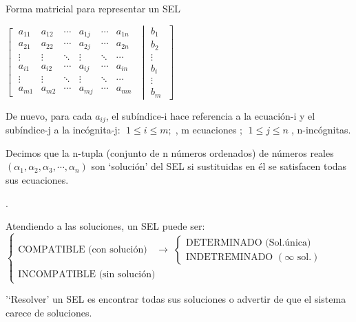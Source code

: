 \begin{myblock}{Forma matricial para representar un SEL}
\centerline{
$\left[ \begin{matrix}
\; a_{11} & a_{12} & \cdots & a_{1j} & \cdots & a_{1n} \;  \\
\; a_{21} & a_{22} & \cdots & a_{2j} & \cdots & a_{2n} \;  \\
\; \vdots & \vdots & \ddots & \vdots & \ddots & \cdots \;  \\
\; a_{i1} & a_{i2} & \cdots & a_{ij} & \cdots & a_{in} \;  \\
\; \vdots & \vdots & \ddots & \vdots & \ddots & \cdots \;  \\
\; a_{m1} & a_{m2} & \cdots & a_{mj} & \cdots & a_{mn} \;  
\end{matrix} \right.$
$\left| \begin{matrix}
\; b_1 \; \\
\; b_2 \;  \\
\; \vdots \; \\
\; b_i \; \\
\; \vdots \; \\
\; b_m \; 	
\end{matrix} \right]$
}
\end{myblock}


De nuevo, para cada $a_{ij}$, el subíndice-i hace referencia a la ecuación-i y el subíndice-j a la incógnita-j: $\; 1\le i\le m;\;$, m ecuaciones ; $ \; 1\le j \le n \;$, n-incógnitas.

\begin{defi}
Decimos que la n-tupla \textcolor{gris}{(conjunto de n números ordenados)} de números reales $(\alpha_1, \alpha_2, \alpha_3, \cdots, \alpha_n)$ son `solución' del SEL si sustituidas en él se satisfacen todas sus ecuaciones. 	
\end{defi}

\begin{defi}.
\begin{myblock}{Atendiendo a las soluciones, un SEL puede ser:}
$\begin{cases}
\text{COMPATIBLE (con solución)	} \; \; 	\to \; \begin{cases}
\text{DETERMINADO (Sol.única)} \\
\text{INDETREMINADO } (\infty \text{ sol.})
\end{cases}
\\
\text{INCOMPATIBLE (sin solución)} 	 \; \begin{matrix}
\text{ } \\
\text{}
\end{matrix}

\end{cases}$
\end{myblock}	
\end{defi}
\begin{defi}
	'`Resolver' un SEL es encontrar todas sus soluciones o advertir de que el sistema carece de soluciones.
\end{defi}

